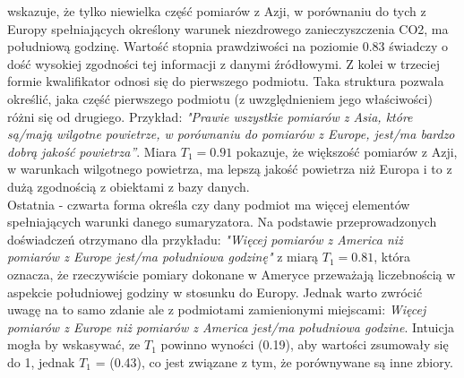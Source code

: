 \documentclass{article}
\begin{document}
wskazuje, że tylko niewielka część pomiarów z Azji, w porównaniu do tych z Europy spełniających określony warunek niezdrowego zanieczyszczenia CO2, ma południową godzinę. Wartość stopnia prawdziwości na poziomie 0.83 świadczy o dość wysokiej zgodności tej informacji z danymi źródłowymi. Z kolei w trzeciej formie kwalifikator odnosi się do pierwszego podmiotu. Taka struktura pozwala określić, jaka część pierwszego podmiotu (z uwzględnieniem jego właściwości) różni się od drugiego. Przykład: \textit{"Prawie wszystkie pomiarów z Asia, które są/mają wilgotne powietrze, w porównaniu do pomiarów z Europe, jest/ma bardzo dobrą jakość powietrza”}. Miara \(T_1 = 0.91\) pokazuje, że większość pomiarów z Azji, w warunkach wilgotnego powietrza, ma lepszą jakość powietrza niż Europa i to z dużą zgodnością z obiektami z bazy danych. \\
Ostatnia - czwarta forma określa czy dany podmiot ma więcej elementów spełniających warunki danego sumaryzatora. Na podstawie przeprowadzonych doświadczeń otrzymano dla przykładu: \textit{"Więcej pomiarów z America niż pomiarów z Europe jest/ma południowa godzinę"} z miarą \(T_1 = 0.81\), która oznacza, że rzeczywiście pomiary dokonane w Ameryce przeważają liczebnością w aspekcie południowej godziny w stosunku do Europy. Jednak warto zwrócić uwagę na to samo zdanie ale z podmiotami zamienionymi miejscami: \textit{Więcej pomiarów z Europe niż pomiarów z America jest/ma południowa godzine}. Intuicja mogła by wskasywać, ze \(T_1\) powinno wyności (0.19), aby wartości zsumowały się do 1, jednak \(T_1\) = (0.43), co jest związane z tym, że porównywane są inne zbiory.
\end{document}
